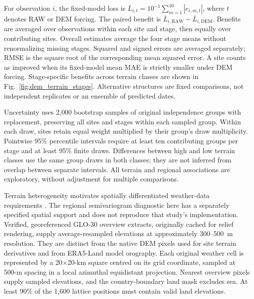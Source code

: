 \documentclass[a4paper,11pt]{article}
\begin{document}
For observation $i$, the fixed-model loss is $\overline{L}_{i,t}=10^{-1}\sum_{m=1}^{10}|e_{i,m,t}|$, where $t$ denotes RAW or DEM forcing. The paired benefit is $\overline{L}_{i,\mathrm{RAW}}-\overline{L}_{i,\mathrm{DEM}}$. Benefits are averaged over observations within each site and stage, then equally over contributing sites. Overall estimates average the four stage means without renormalizing missing stages. Squared and signed errors are averaged separately; RMSE is the square root of the corresponding mean squared error. A site counts as improved when its fixed-model mean MAE is strictly smaller under DEM forcing. Stage-specific benefits across terrain classes are shown in Fig.~\ref{fig:dem_terrain_stages}. Alternative structures are fixed comparisons, not independent replicates or an ensemble of predicted dates.

Uncertainty uses 2,000 bootstrap samples of original independence groups with replacement, preserving all sites and stages within each sampled group. Within each draw, sites retain equal weight multiplied by their group's draw multiplicity. Pointwise 95\% percentile intervals require at least ten contributing groups per stage and at least 95\% finite draws. Differences between high and low terrain classes use the same group draws in both classes; they are not inferred from overlap between separate intervals. All terrain and regional associations are exploratory, without adjustment for multiple comparisons.

Terrain heterogeneity motivates spatially differentiated weather-data requirements \citep{zhaoDemand2015}. The regional semivariogram diagnostic here has a separately specified spatial support and does not reproduce that study's implementation. Verified, georeferenced GLO-30 overview extracts, originally cached for relief rendering, supply average-resampled elevations at approximately 300--500~m resolution. They are distinct from the native DEM pixels used for site terrain derivatives and from ERA5-Land model orography. Each original weather cell is represented by a 20$\times$20-km square centred on its grid coordinate, sampled at 500-m spacing in a local azimuthal equidistant projection. Nearest overview pixels supply sampled elevations, and the country-boundary land mask excludes sea. At least 90\% of the 1,600 lattice positions must contain valid land elevations.
\end{document}

